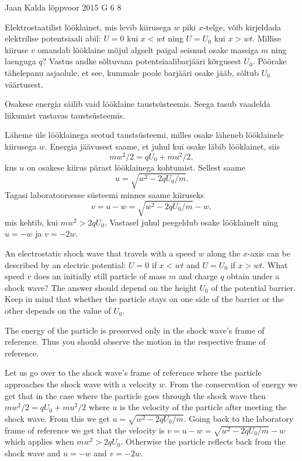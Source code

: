 {Jaan Kalda} %
{lõppvoor} %
{2015} %
{G 6} %
{8} %
{
\ifStatement
Elektrostaatilist lööklainet, mis levib kiirusega $w$ piki $x$-telge, võib kirjeldada elektrilise potentsiaali abil: $U=0$ kui $x<wt$ ning $U=U_0$ kui $x>wt$. Millise kiiruse $v$ omandab lööklaine mõjul algselt paigal seisnud osake massiga $m$ ning laenguga $q$? Vastus andke sõltuvana potentsiaalibarjääri kõrgusest $U_0$. Pöörake tähelepanu asjaolule, et see, kummale poole barjääri osake jääb, sõltub $U_0$ väärtusest. 
\fi


\ifHint
Osakese energia säilib vaid lööklaine taustsüsteemis. Seega tasub vaadelda liikumist vastavas taustsüsteemis.
\fi


\ifSolution
Läheme üle lööklainega seotud taustsüsteemi, milles osake läheneb lööklainele kiirusega $w$. Energia jäävusest saame, et juhul kui osake läbib lööklainet, siis 
\[
mw^2/2=qU_0+mu^2/2,
\]
kus $u$ on osakese kiirus pärast lööklainega kohtumist. Sellest saame
\[
u=\sqrt{w^2-2qU_0/m}.
\]
Tagasi laboratoorsesse süsteemi 
minnes saame kiiruseks
\[
v=u-w=\sqrt{w^2-2qU_0/m}-w,
\]
mis kehtib, kui $mw^2>2qU_0$. Vastasel juhul peegeldub osake lööklainelt ning
$u=-w$ ja $v=-2w$.
\fi


\ifEngStatement
An electrostatic shock wave that travels with a speed $w$ along the $x$-axis can be described by an electric potential: $U=0$ if $x<wt$ and $U=U_0$ if $x>wt$. What speed $v$ does an initially still particle of mass $m$ and charge $q$ obtain under a shock wave? The answer should depend on the height $U_0$ of the potential barrier. Keep in mind that whether the particle stays on one side of the barrier or the other depends on the value of $U_0$.
\fi


\ifEngHint
The energy of the particle is preserved only in the shock wave’s frame of reference. Thus you should observe the motion in the respective frame of reference.
\fi


\ifEngSolution
Let us go over to the shock wave's frame of reference where the particle approaches the shock wave with a velocity $w$. From the conservation of energy we get that in the case where the particle goes through the shock wave then $mw^2/2=qU_0+mu^2/2$ where $u$ is the velocity of the particle after meeting the shock wave. From this we get $u=\sqrt{w^2-2qU_0/m}$. Going back to the laboratory frame of reference we get that the velocity is $v=u-w=\sqrt{w^2-2qU_0/m}-w$ which applies when $mw^2>2qU_0$. Otherwise the particle reflects back from the shock wave and $u=-w$ and $v=-2w$.
\fi
}